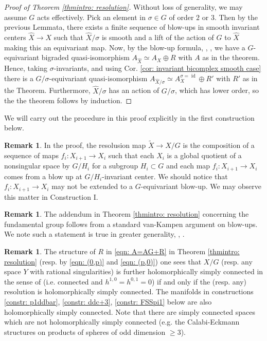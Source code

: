 \documentclass[12pt,reqno]{amsart}
\theoremstyle{definition}
\newtheorem{rem}[thm]{Remark}
\DeclareMathOperator{\id}{id}
\begin{document}
\begin{proof}[Proof of Theorem \ref{thmintro: resolution}]

Without loss of generality, we may assume $G$ acts effectively. Pick an element in $\sigma\in G$ of order $2$ or $3$. Then by the previous Lemmata, there exists a finite sequence of blow-ups in smooth invariant centers $\hat X\to X$ such that $\hat X/\sigma$ is smooth and a lift of the action of $G$ to $\hat X$ making this an equivariant map. Now, by the blow-up formula, \cite{Ste21b}, \cite{ASTT}, we have a $G$-equivariant bigraded quasi-isomorphism $A_{\hat X}\simeq A_X\oplus R$ with $A$ as in the theorem. Hence, taking $\sigma$-invariants, and using Cor. \ref{cor: invariant bicomplex smooth case} there is a $G/\sigma$-equivariant quasi-isomorphism $A_{\hat X/\sigma}\simeq A_X^{\sigma=\id}\oplus R'$ with $R'$ as in the Theorem. Furthermore, $\hat X/\sigma$ has an action of $G/\sigma$, which has lower order, so the the theorem follows by induction.    
\end{proof}



We will carry out the procedure in this proof explicitly in the first construction below.
\begin{rem}
In the proof, the resolusion map $\tilde X\to X/G$ is the composition of a sequence of maps $f_{i}:X_{i+1}\to X_{i}$ such that each $X_{i}$ is a global quotient of a nonsingular space by $G/H_{i}$ for a subgroup $H_{i}\subset G$ and each map $f_{i}:X_{i+1}\to X_{i}$ comes from a blow up at $G/H_{i}$-invariant center.
We should notice that $f_{i}:X_{i+1}\to X_{i}$ may not be extended to a $G$-equivariant blow-up.
We may observe this matter in Construction I.
\end{rem}



\begin{rem} The addendum in Theorem \ref{thmintro: resolution} concerning the fundamental group follows from a standard van-Kampen argument on blow-ups. We note such a statement is true in greater generality, \cite[Thm. 7.5.]{kol}, \cite{tak}.
\end{rem}

\begin{rem}
The structure of $R$ in \eqref{eqn: A=AG+R} in Theorem \ref{thmintro: resolution} (resp. by \eqref{eqn: (0,p)} and \eqref{eqn: (p,0)}) one sees that $X/G$ (resp. any space $Y$ with rational singularities) is further holomorphically simply connected in the sense of \cite{Ste23} (i.e. connected and $h^{1,0}=h^{0,1}=0$) if and only if the (resp. any) resolution is holomorphically simply connected. The manifolds in constructions \ref{constr: p1ddbar}, \ref{constr: ddc+3}, \ref{constr: FSSpi1} below are also holomorphically simply connected. Note that there are simply connected spaces which are not holomorphically simply connected (e.g. the Calabi-Eckmann structures on products of spheres of odd dimension $\geq 3$).
\end{rem}
\end{document}
